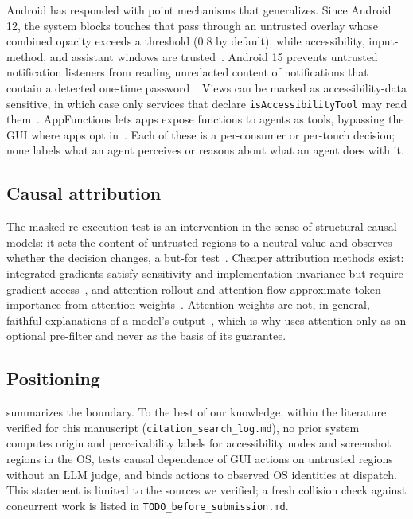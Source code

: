 Android has responded with point mechanisms that \PG{} generalizes. Since Android 12, the system blocks touches that pass through an untrusted overlay whose combined opacity exceeds a threshold (0.8 by default), while accessibility, input-method, and assistant windows are trusted~\cite{android12_untrusted_touch}. Android 15 prevents untrusted notification listeners from reading unredacted content of notifications that contain a detected one-time password~\cite{android15_otp_redaction}. Views can be marked as accessibility-data sensitive, in which case only services that declare \texttt{isAccessibilityTool} may read them~\cite{android_blog_a11y_sensitive,android_accessibilityserviceinfo}. AppFunctions lets apps expose functions to agents as tools, bypassing the GUI where apps opt in~\cite{android_appfunctions}. Each of these is a per-consumer or per-touch decision; none labels what an agent perceives or reasons about what an agent does with it.

\subsection{Causal attribution}\label{sec:rw-causal}

The masked re-execution test is an intervention in the sense of structural causal models: it sets the content of untrusted regions to a neutral value and observes whether the decision changes, a but-for test~\cite{pearl2009causality}. Cheaper attribution methods exist: integrated gradients satisfy sensitivity and implementation invariance but require gradient access~\cite{sundararajan2017axiomatic}, and attention rollout and attention flow approximate token importance from attention weights~\cite{abnar2020attentionflow}. Attention weights are not, in general, faithful explanations of a model's output~\cite{jain2019attention}, which is why \PG{} uses attention only as an optional pre-filter and never as the basis of its guarantee.

\subsection{Positioning}\label{sec:rw-position}

 summarizes the boundary. To the best of our knowledge, within the literature verified for this manuscript (\texttt{citation\_search\_log.md}), no prior system computes origin and perceivability labels for accessibility nodes and screenshot regions in the OS, tests causal dependence of GUI actions on untrusted regions without an LLM judge, and binds actions to observed OS identities at dispatch. This statement is limited to the sources we verified; a fresh collision check against concurrent work is listed in \texttt{TODO\_before\_submission.md}.

